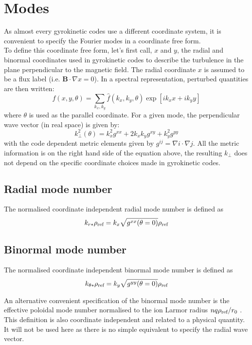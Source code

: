 \documentclass[fleqn]{report}
\begin{document}
\section{Modes}
As almost every gyrokinetic codes use a different coordinate system, it is convenient to specify the Fourier modes in a coordinate free form.\\
To define this coordinate free form, let's first call, $x$ and $y$, the radial and binormal coordinates used in gyrokinetic codes to describe the turbulence in the plane perpendicular to the magnetic field. The radial coordinate $x$ is assumed to be a flux label (i.e. $\mathbf{B}\cdot \nabla x =0$).
In a spectral representation, perturbed quantities are then written:
\begin{equation}
 f(x,y,\theta) = \sum_{k_x,k_y} \hat{f}(k_x,k_y,\theta)\exp[ik_x x + ik_y y] 
\end{equation}
where $\theta$ is used as the parallel coordinate.
For a given mode, the perpendicular wave vector (in real space) is given by:
\begin{equation}
 k_\perp^2(\theta) = k_x^2 g^{xx} + 2k_xk_y g^{xy} + k_y^2g^{yy}
\end{equation}
with the code dependent metric elements given by $g^{ij}=\nabla i \cdot \nabla j$. All the metric information is on the right hand side of the equation above, the resulting $k_\perp$ does not depend on the specific coordinate choices made in gyrokinetic codes.

\subsection{Radial mode number}
The normalised coordinate independent radial mode number is defined as
\begin{equation}
 k_{r*}\rho_{\textrm{ref}} = k_x \sqrt{g^{xx}(\theta=0)} \rho_{\textrm{ref}}
\end{equation}

\subsection{Binormal mode number}
The normalised coordinate independent binormal mode number is defined as
\begin{equation}
 k_{\theta*}\rho_{\textrm{ref}} = k_y \sqrt{g^{yy}(\theta=0)} \rho_{\textrm{ref}}
\end{equation}

An alternative convenient specification of the binormal mode number is the effective poloidal mode number normalised to the ion Larmor radius  $nq\rho_{\textrm{ref}}/r_0$  \cite{Merlo:PoP2016}. This definition is also coordinate independent and related to a physical quantity. It will not be used here as there is no simple equivalent to specify the radial wave vector.
\end{document}
